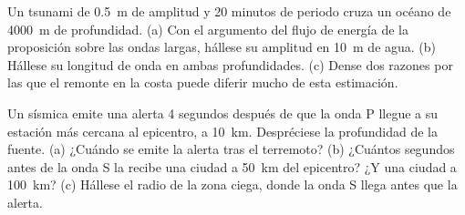 \begin{exercise}[$\star\star\star$]\label{exo:b2:geological-hazards:11}
Un tsunami de \qty{0.5}{m} de amplitud y 20 minutos de periodo cruza un océano de \qty{4000}{m} de profundidad. (a)
Con el argumento del flujo de energía de la proposición sobre las ondas largas, hállese su amplitud en \qty{10}{m}
de agua. (b) Hállese su longitud de onda en ambas profundidades. (c) Dense dos razones por las que el remonte en la costa
puede diferir mucho de esta estimación.
\end{exercise}

\begin{exercise}[$\star\star\star$]\label{exo:b2:geological-hazards:12}
Un  sísmica emite una alerta 4 segundos después de que la onda P llegue a su estación
más cercana al epicentro, a \qty{10}{km}. Despréciese la profundidad de la fuente. (a) ¿Cuándo se
emite la alerta tras el terremoto? (b) ¿Cuántos segundos antes de la onda S la recibe una ciudad a \qty{50}{km}
del epicentro? ¿Y una ciudad a \qty{100}{km}? (c) Hállese el radio de la zona ciega, donde
la onda S llega antes que la alerta.
\end{exercise}

